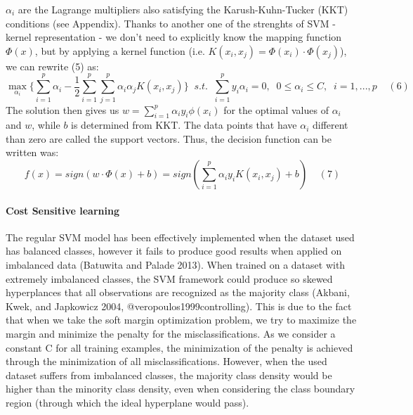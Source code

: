 \documentclass[12pt,]{article}
\let\oldparagraph\paragraph
\renewcommand{\paragraph}[1]{\oldparagraph{#1}\mbox{}}
\begin{document}
\(\alpha_i\) are the Lagrange multipliers also satisfying the
Karush-Kuhn-Tucker (KKT) conditions (see Appendix). Thanks to another
one of the strenghts of SVM - kernel representation - we don't need to
explicitly know the mapping function \(\Phi(x)\), but by applying a
kernel function (i.e. \(K(x_i,x_j) = \Phi(x_i)\cdot \Phi(x_j)\)), we can
rewrite (5) as:
\[\max_{\alpha_i} \{ \sum_{i=1}^{p}{\alpha_i} - \frac{1}{2} \sum_{i=1}^{p}\sum_{j=1}^{p}{\alpha_i\alpha_jK(x_i,x_j)} \} \;\; s.t. \;\; \sum_{i=1}^{p}{y_i\alpha_i}=0, \;\; 0 \leq\alpha_i\leq C, \;\; i=1,...,p\;\;\;\;(6)\]
The solution then gives us \(w = \sum_{i=1}^{p}{\alpha_iy_i}\phi(x_i)\)
for the optimal values of \(\alpha_i\) and \(w\), while \(b\) is
determined from KKT. The data points that have \(\alpha_i\) different
than zero are called the support vectors. Thus, the decision function
can be written was:
\[f(x) = sign(w \cdot \Phi(x) + b) = sign(\sum_{i=1}^{p}{\alpha_iy_i}K(x_i,x_j) + b)\;\;\;\;(7) \]

\hypertarget{cost-sensitive-learning}{%
\paragraph{Cost Sensitive learning}\label{cost-sensitive-learning}}

The regular SVM model has been effectively implemented when the dataset
used has balanced classes, however it fails to produce good results when
applied on imbalanced data (Batuwita and Palade 2013). When trained on a
dataset with extremely imbalanced classes, the SVM framework could
produce so skewed hyperplances that all observations are recognized as
the majority class (Akbani, Kwek, and Japkowicz 2004,
@veropoulos1999controlling). This is due to the fact that when we take
the soft margin optimization problem, we try to maximize the margin and
minimize the penalty for the misclassifications. As we consider a
constant C for all training examples, the minimization of the penalty is
achieved through the minimization of all misclassifications. However,
when the used dataset suffers from imbalanced classes, the majority
class density would be higher than the minority class density, even when
considering the class boundary region (through which the ideal
hyperplane would pass).
\end{document}
